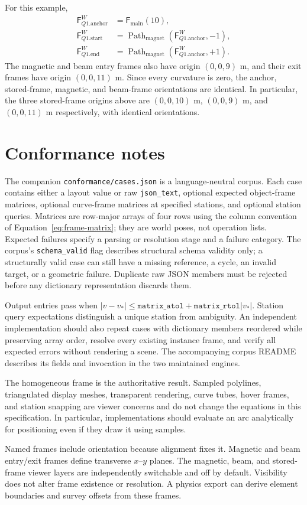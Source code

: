 \documentclass[11pt,a4paper]{article}
\newcommand{\Frame}{\mathsf{F}}
\newcommand{\Path}{\operatorname{Path}}
\begin{document}
For this example,
\begin{align*}
 \Frame_{Q1.\mathrm{anchor}}^W&=\Frame_{\mathrm{main}}(10),\\
 \Frame_{Q1.\mathrm{start}}^W
   &=\Path_{\mathrm{magnet}}(\Frame_{Q1.\mathrm{anchor}}^W,-1),\\
 \Frame_{Q1.\mathrm{end}}^W
   &=\Path_{\mathrm{magnet}}(\Frame_{Q1.\mathrm{anchor}}^W,+1).
\end{align*}
The magnetic and beam entry frames also have origin $(0,0,9)$ m, and their
exit frames have origin $(0,0,11)$ m.  Since every curvature is zero, the
anchor, stored-frame, magnetic, and beam-frame orientations are identical.
In particular, the three stored-frame origins above are
$(0,0,10)$ m, $(0,0,9)$ m, and $(0,0,11)$ m respectively, with identical
orientations.

\section{Conformance notes}

The companion \texttt{conformance/cases.json} is a language-neutral corpus.
Each case contains either a layout value or raw \texttt{json\_text}, optional
expected object-frame matrices, optional curve-frame matrices at specified
stations, and optional station queries. Matrices are row-major arrays of four
rows using the column convention of Equation~\eqref{eq:frame-matrix}; they
are world poses, not operation lists. Expected failures specify a parsing or
resolution stage and a failure category. The corpus's \texttt{schema\_valid}
flag describes structural schema validity only; a structurally valid case can
still have a missing reference, a cycle, an invalid target, or a geometric
failure. Duplicate raw JSON members must be rejected before any dictionary
representation discards them.

Output entries pass when
$|v-v_*|\le\texttt{matrix\_atol}+\texttt{matrix\_rtol}|v_*|$.
Station query expectations distinguish a unique station from ambiguity.
An independent implementation should also repeat cases with dictionary members
reordered while preserving array order, resolve every existing instance frame,
and verify all expected errors without rendering a scene. The accompanying
corpus README describes its fields and invocation in the two maintained engines.

The homogeneous frame is the authoritative result.  Sampled polylines,
triangulated display meshes, transparent rendering, curve tubes, hover frames,
and station snapping are viewer concerns and do not change the equations in
this specification.  In particular, implementations should evaluate an arc
analytically for positioning even if they draw it using samples.

Named frames include orientation because alignment fixes it. Magnetic and beam
entry/exit frames define transverse $x$--$y$ planes. The magnetic, beam, and
stored-frame viewer layers are independently switchable and off by default.
Visibility does not alter frame existence or resolution. A physics export can
derive element boundaries and survey offsets from these frames.
\end{document}
